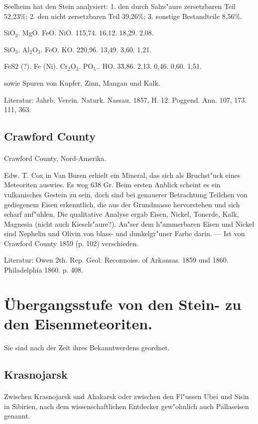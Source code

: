 \documentclass[a4paper, 11pt, oneside]{article}
\begin{document}
Seelheim hat den Stein analysiert: 1. den durch Salzs"aure zersetzbaren Teil 52,23\%; 2. den nicht zersetzbaren Teil 39,26\%; 3. sonstige Bestandteile 8,56\%.

SiO$_{3}$. MgO. FeO. NiO.  
1\. 15,74. 16,12. 18,29. 2,08.

SiO$_{3}$. Al$_{2}$O$_{3}$. FeO. KO.  
2\. 20,96. 13,49. 3,60. 1,21.

FeS2 (?). Fe (Ni). Cr$_{2}$O$_{3}$. PO$_{5}$.. HO.  
3\. 3,86. 2,13. 0,46. 0,60. 1,51.

sowie Spuren von Kupfer, Zinn, Mangan und Kalk.

\footnotesize
Literatur: Jahrb. Verein. Naturk. Nassau. 1857, H. 12. Poggend. Ann. 107, 173. 111, 363.

\subsection{Crawford County}
\normalsize
\paragraph{}
Crawford County, Nord-Amerika.

Edw. T. Cox in Van Buren erhielt ein Mineral, das sich als Bruchst"uck eines Meteoriten auswies. Es wog 638 Gr. Beim ersten Anblick scheint es ein vulkanisches Gestein zu sein, doch sind bei genauerer Betrachtung Teilchen von gediegenem Eisen erkenntlich, die aus der Grundmasse hervorstehen und sich scharf anf"uhlen. Die qualitative Analyse ergab Eisen, Nickel, Tonerde, Kalk, Magnesia (nicht auch Kiesels"aure?). Au"ser dem h"ammerbaren Eisen und Nickel sind Nephelin und Olivin von blass- und dunkelgr"uner Farbe darin. --- Ist von Crawford County 1859 (p. 102) verschieden.

Literatur: Owen 2th. Rep. Geol. Reconnoiss. of Arkansas. 1859 und 1860. Philadelphia 1860. p. 408.

\section{Übergangsstufe von den Stein- zu den Eisenmeteoriten.}

Sie sind nach der Zeit ihres Bekanntwerdens geordnet.

\subsection{Krasnojarsk}
\normalsize
\paragraph{}
Zwischen Krasnojarsk und Ahakarsk oder zwischen den Fl"ussen Ubei und Sisin in Sibirien, nach dem wissenschaftlichen Entdecker gew"ohnlich auch Pallaseisen genannt.
\end{document}
